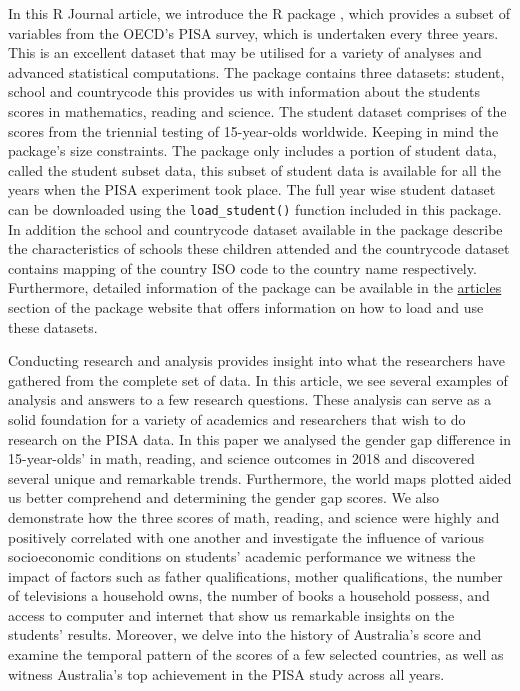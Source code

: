 In this R Journal article, we introduce the R package , which provides a subset of variables from the OECD's PISA survey, which is undertaken every three years. This is an excellent dataset that may be utilised for a variety of analyses and advanced statistical computations. The package contains three datasets: student, school and countrycode this provides us with information about the students scores in mathematics, reading and science. The student dataset comprises of the scores from the triennial testing of 15-year-olds worldwide. Keeping in mind the package's size constraints. The package only includes a portion of student data, called the student subset data, this subset of student data is available for all the years when the PISA experiment took place. The full year wise student dataset can be downloaded using the \texttt{load\_student()} function included in this package. In addition the school and countrycode dataset available in the package describe the characteristics of schools these children attended and the countrycode dataset contains mapping of the country ISO code to the country name respectively. Furthermore, detailed information of the  package can be available in the \href{https://kevinwang09.github.io/learningtower/articles/learningtower_school.html}{articles} section of the package website that offers information on how to load and use these datasets.

Conducting research and analysis provides insight into what the researchers have gathered from the complete set of data. In this article, we see several examples of analysis and answers to a few research questions. These analysis can serve as a solid foundation for a variety of academics and researchers that wish to do research on the PISA data. In this paper we analysed the gender gap difference in 15-year-olds' in math, reading, and science outcomes in 2018 and discovered several unique and remarkable trends. Furthermore, the world maps plotted aided us better comprehend and determining the gender gap scores. We also demonstrate how the three scores of math, reading, and science were highly and positively correlated with one another and investigate the influence of various socioeconomic conditions on students' academic performance we witness the impact of factors such as father qualifications, mother qualifications, the number of televisions a household owns, the number of books a household possess, and access to computer and internet that show us remarkable insights on the students' results. Moreover, we delve into the history of Australia's score and examine the temporal pattern of the scores of a few selected countries, as well as witness Australia's top achievement in the PISA study across all years.

